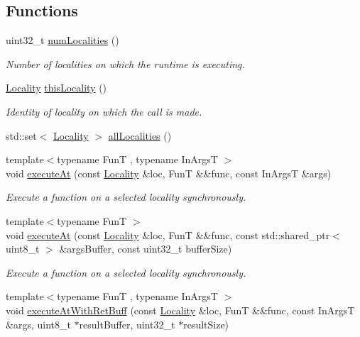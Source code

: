 \subsection*{Functions}
\begin{DoxyCompactItemize}
\item 
uint32\-\_\-t \hyperlink{namespaceshad_1_1rt_a199bb50c21e9012f615520413872aef6}{num\-Localities} ()
\begin{DoxyCompactList}\small\item\em Number of localities on which the runtime is executing. \end{DoxyCompactList}\item 
\hyperlink{classshad_1_1rt_1_1Locality}{Locality} \hyperlink{namespaceshad_1_1rt_a7536c33738a5dd285f3a44aa6a199faf}{this\-Locality} ()
\begin{DoxyCompactList}\small\item\em Identity of locality on which the call is made. \end{DoxyCompactList}\item 
std\-::set$<$ \hyperlink{classshad_1_1rt_1_1Locality}{Locality} $>$ \hyperlink{namespaceshad_1_1rt_adea42bceb84b2161df8fece9d20cb7cf}{all\-Localities} ()
\item 
{\footnotesize template$<$typename Fun\-T , typename In\-Args\-T $>$ }\\void \hyperlink{namespaceshad_1_1rt_ae4b428e7e47fc07e01707b3abb01caa2}{execute\-At} (const \hyperlink{classshad_1_1rt_1_1Locality}{Locality} \&loc, Fun\-T \&\&func, const In\-Args\-T \&args)
\begin{DoxyCompactList}\small\item\em Execute a function on a selected locality synchronously. \end{DoxyCompactList}\item 
{\footnotesize template$<$typename Fun\-T $>$ }\\void \hyperlink{namespaceshad_1_1rt_a5bc582ecab17be55af910f8a6e3e31f5}{execute\-At} (const \hyperlink{classshad_1_1rt_1_1Locality}{Locality} \&loc, Fun\-T \&\&func, const std\-::shared\-\_\-ptr$<$ uint8\-\_\-t $>$ \&args\-Buffer, const uint32\-\_\-t buffer\-Size)
\begin{DoxyCompactList}\small\item\em Execute a function on a selected locality synchronously. \end{DoxyCompactList}\item 
{\footnotesize template$<$typename Fun\-T , typename In\-Args\-T $>$ }\\void \hyperlink{namespaceshad_1_1rt_acadca86a92a75be85e51534f905b7fef}{execute\-At\-With\-Ret\-Buff} (const \hyperlink{classshad_1_1rt_1_1Locality}{Locality} \&loc, Fun\-T \&\&func, const In\-Args\-T \&args, uint8\-\_\-t $\ast$result\-Buffer, uint32\-\_\-t $\ast$result\-Size)

\end{DoxyCompactItemize}
